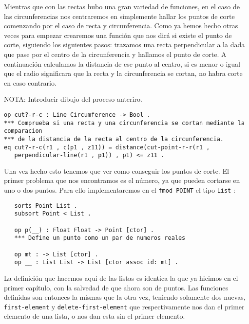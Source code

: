 Mientras que con las rectas hubo una gran variedad de funciones, en el caso de las circunferencias nos centraremos en simplemente hallar los puntos de corte comenzando por el caso de recta y circunferencia. Como ya hemos hecho otras veces para empezar crearemos una función que nos dirá si existe el punto de corte, siguiendo los siguientes pasos: trazamos una recta perpendicular a la dada que pase por el centro de la circunferencia y hallamos el punto de corte. A continuación calculamos la distancia de ese punto al centro, si es menor o igual que el radio significara que la recta y la circunferencia se cortan, no habra corte en caso contrario.\par

NOTA: Introducir dibujo del proceso anteriro.\par
{\codesize
\begin{verbatim}
op cut?-r-c : Line Circumference -> Bool .
*** Comprueba si una recta y una circunferencia se cortan mediante la comparacion 
*** de la distancia de la recta al centro de la circunferencia.
eq cut?-r-c(r1 , c(p1 , z11)) = distance(cut-point-r-r(r1 , 
   perpendicular-line(r1 , p1)) , p1) <= z11 .
\end{verbatim}
}

Una vez hecho esto tenemos que ver como conseguir los puntos de corte. El primer problema que nos encontramos es el número, ya que pueden cortarse en uno o dos puntos. Para ello implementaremos en el \texttt{fmod POINT} el tipo \texttt{List} :

{\codesize
\begin{verbatim}
   sorts Point List .
   subsort Point < List .

   op p(__) : Float Float -> Point [ctor] .
   *** Define un punto como un par de numeros reales

   op mt : -> List [ctor] .
   op __ : List List -> List [ctor assoc id: mt] . 
\end{verbatim}
}

La definición que hacemos aqui de las listas es identica la que ya hicimos en el primer capítulo, con la salvedad de que ahora son de puntos. Las funciones definidas son entonces la mismas que la otra vez, teniendo solamente dos nuevas, \texttt{first-element} y \texttt{delete-first-element} que respectivamente nos dan el primer elemento de una lista, o nos dan esta sin el primer elemento.\par

